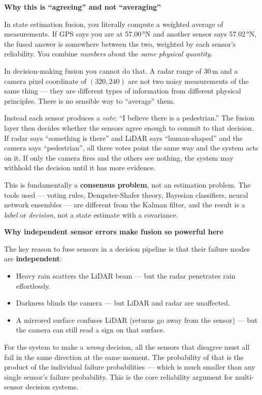 \documentclass[12pt, a4paper]{article}
\begin{document}
\begin{notebox}
  \textbf{Why this is ``agreeing'' and not ``averaging''}

  In state estimation fusion, you literally compute a weighted average of
  measurements.
  If GPS says you are at 57.00\,°N and another sensor says 57.02\,°N,
  the fused answer is somewhere between the two, weighted by each sensor's
  reliability.
  You combine \emph{numbers} about the \emph{same physical quantity}.

  In decision-making fusion you cannot do that.
  A radar range of 30\,m and a camera pixel coordinate of $(320, 240)$
  are not two noisy measurements of the same thing --- they are different
  types of information from different physical principles.
  There is no sensible way to ``average'' them.

  Instead each sensor produces a \emph{vote}: ``I believe there is a
  pedestrian.''
  The fusion layer then decides whether the sensors agree enough to commit
  to that decision.
  If radar says ``something is there'' and LiDAR says ``human-shaped''
  and the camera says ``pedestrian'', all three votes point the same way
  and the system acts on it.
  If only the camera fires and the others see nothing, the system may
  withhold the decision until it has more evidence.

  This is fundamentally a \textbf{consensus problem}, not an estimation
  problem.
  The tools used --- voting rules, Dempster-Shafer theory, Bayesian
  classifiers, neural network ensembles --- are different from the Kalman
  filter, and the result is a \emph{label} or \emph{decision}, not a state
  estimate with a covariance.
\end{notebox}

\begin{notebox}
  \textbf{Why independent sensor errors make fusion so powerful here}

  The key reason to fuse sensors in a decision pipeline is that their
  failure modes are \textbf{independent}:
  \begin{itemize}[leftmargin=1.2em, itemsep=2pt]
    \item Heavy rain scatters the LiDAR beam --- but the radar penetrates
      rain effortlessly.
    \item Darkness blinds the camera --- but LiDAR and radar are unaffected.
    \item A mirrored surface confuses LiDAR (returns go away from the
      sensor) --- but the camera can still read a sign on that surface.
  \end{itemize}
  For the system to make a \emph{wrong} decision, all the sensors that
  disagree must all fail in the same direction at the same moment.
  The probability of that is the product of the individual failure
  probabilities --- which is much smaller than any single sensor's failure
  probability.
  This is the core reliability argument for multi-sensor decision systems.
\end{notebox}
\end{document}
